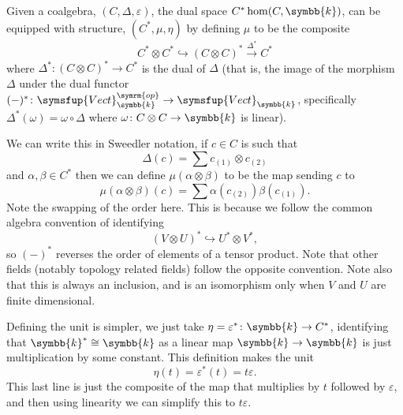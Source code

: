 \documentclass[fleqn]{NotesClass}
\makeatletter
\newcommand{\c@egory}[1]{\symsfup{#1}}
\newcommand{\Vect}[1][\field]{\c@egory{Vect}_{#1}}
\newcommand{\isomorphic}{\cong}
\renewcommand{\field}{\symbb{k}}
\newcommand{\op}{\symrm{op}}
\makeatother
\begin{document}
    Given a coalgebra, \((C, \Delta, \varepsilon)\), the dual space \(C^* \hom(C, \field)\), can be equipped with structure, \((C^*, \mu, \eta)\) by defining \(\mu\) to be the composite
    \begin{equation}
        C^* \otimes C^* \hookrightarrow (C \otimes C)^* \xrightarrow{\Delta^*} C^*
    \end{equation}
    where \(\Delta^* \colon (C \otimes C)^* \to C^*\) is the dual of \(\Delta\) (that is, the image of the morphism \(\Delta\) under the dual functor \((-)^* \colon \Vect^{\op} \to \Vect\), specifically \(\Delta^*(\omega) = \omega \circ \Delta\) where \(\omega \colon C \otimes C \to \field\) is linear).
    
    We can write this in Sweedler notation, if \(c \in C\) is such that
    \begin{equation}
        \Delta(c) = \sum c_{(1)} \otimes c_{(2)}
    \end{equation}
    and \(\alpha, \beta \in C^*\) then we can define \(\mu(\alpha \otimes \beta)\) to be the map sending \(c\) to
    \begin{equation}
        \mu(\alpha \otimes \beta)(c) = \sum \alpha(c_{(2)}) \beta(c_{(1)}).
    \end{equation}
    Note the swapping of the order here.
    This is because we follow the common algebra convention of identifying
    \begin{equation}
        (V \otimes U)^* \hookrightarrow U^* \otimes V^*,
    \end{equation}
    so \((-)^*\) reverses the order of elements of a tensor product.
    Note that other fields (notably topology related fields) follow the opposite convention.
    Note also that this is always an inclusion, and is an isomorphism only when \(V\) and \(U\) are finite dimensional.
    
    Defining the unit is simpler, we just take \(\eta = \varepsilon^* \colon \field \to C^*\), identifying that \(\field^* \isomorphic \field\) as a linear map \(\field \to \field\) is just multiplication by some constant.
    This definition makes the unit
    \begin{equation}
        \eta(t) = \varepsilon^*(t) = t \varepsilon.
    \end{equation}
    This last line is just the composite of the map that multiplies by \(t\) followed by \(\varepsilon\), and then using linearity we can simplify this to \(t \varepsilon\).
    
\end{document}
